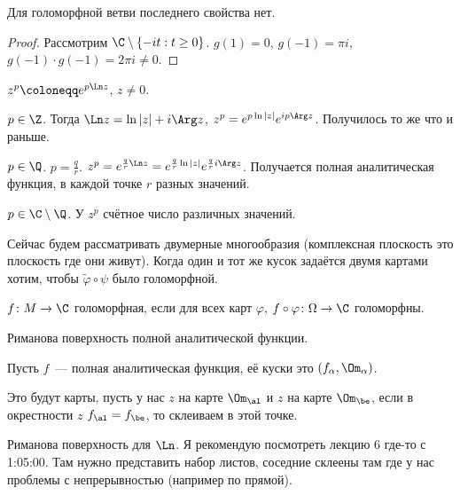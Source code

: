 \begin{observation}
    Для голоморфной ветви последнего свойства нет.
\end{observation}

\begin{proof}
    Рассмотрим $\C \setminus \left\{-it : t \ge 0\right\}$.
    $g(1) = 0$, $g(-1) = \pi i$, $g(-1) \cdot g(-1) = 2\pi i \ne 0$.
\end{proof}

\begin{definition}
    $z^p \coloneqq e^{p\Ln z}$, $z \ne 0$.
\end{definition}

\begin{observation}
    $p \in \Z$. Тогда
    $\Ln z = \ln |z| + i\Arg z$,
    $z^p = e^{p\ln |z|}e^{ip \Arg z}$.
    Получилось то же что и раньше.
\end{observation}

\begin{observation}
    $p \in \Q$. $p = \frac{q}{r}$.
    $z^p = e^{\frac{q}{r}\Ln z} = e^{\frac{q}{r}\ln |z|}
        e^{\frac{q}{r} i \Arg z}$.
    Получается полная аналитическая функция,
    в каждой точке $r$ разных значений.
\end{observation}

\begin{observation}
    $p \in \C \setminus \Q$.
    У $z^p$ счётное число различных значений.
\end{observation}

Сейчас будем рассматривать двумерные многообразия
(комплексная плоскость это плоскость где они живут).
Когда один и тот же кусок задаётся двумя картами
хотим, чтобы $\widetilde{\varphi} \circ \psi$ было голоморфной.

\begin{definition}
    $f \colon M \to \C$ голоморфная, если
    для всех карт $\varphi$, $f \circ \varphi \colon
        \Omega \to \C$ голоморфны.
\end{definition}

\begin{definition}
    Риманова поверхность полной аналитической функции.

    Пусть $f$~--- полная аналитическая функция,
    её куски это $(f_\alpha, \Om_\alpha)$.

    Это будут карты, пусть у нас $z$ на карте
    $\Om_\al$ и $z$ на карте $\Om_\be$,
    если в окрестности $z$ $f_\al = f_\be$, то
    склеиваем в этой точке.
\end{definition}

\begin{example}
    Риманова поверхность для $\Ln$.
    Я рекомендую посмотреть лекцию
    6 где-то с 1:05:00. Там нужно представить
    набор листов, соседние склеены там где у нас
    проблемы с непрерывностью (например по прямой).
\end{example}
